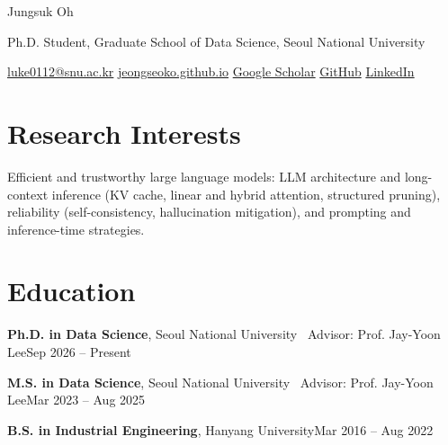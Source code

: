 \documentclass[10pt]{article}
\newcommand{\link}[2]{\href{#1}{\color{accent}#2}}
\newcommand{\when}[1]{\hfill{\color{muted}#1}}
\newcommand{\sub}[1]{{\color{muted}#1}}
\begin{document}
\fontsize{9.6}{12.4}\selectfont

{\displayfont\fontsize{23}{27}\selectfont Jungsuk Oh}\par
\vspace{2pt}
\sub{Ph.D. Student, Graduate School of Data Science, Seoul National University}\par
\vspace{2pt}
\link{mailto:luke0112@snu.ac.kr}{luke0112@snu.ac.kr}\enspace\textperiodcentered\enspace
\link{https://jeongseoko.github.io/}{jeongseoko.github.io}\enspace\textperiodcentered\enspace
\link{https://scholar.google.com/citations?user=WV5svAIAAAAJ}{Google Scholar}\enspace\textperiodcentered\enspace
\link{https://github.com/jeongseokO}{GitHub}\enspace\textperiodcentered\enspace
\link{https://www.linkedin.com/in/\%EC\%A0\%95\%EC\%84\%9D-\%EC\%98\%A4-438528255}{LinkedIn}\par

\section{Research Interests}
Efficient and trustworthy large language models: LLM architecture and long-context inference (KV cache, linear and hybrid attention, structured pruning), reliability (self-consistency, hallucination mitigation), and prompting and inference-time strategies.

\section{Education}
\textbf{Ph.D. in Data Science}, Seoul National University \sub{\textperiodcentered\ Advisor: Prof. Jay-Yoon Lee}\when{Sep 2026 -- Present}\par
\textbf{M.S. in Data Science}, Seoul National University \sub{\textperiodcentered\ Advisor: Prof. Jay-Yoon Lee}\when{Mar 2023 -- Aug 2025}\par
\textbf{B.S. in Industrial Engineering}, Hanyang University\when{Mar 2016 -- Aug 2022}\par

\end{document}
